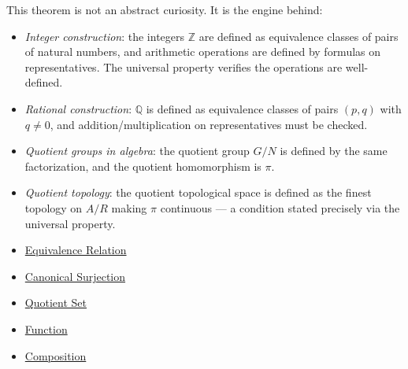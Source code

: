 \begin{remark*}[Exposition]
This theorem is not an abstract curiosity. It is the engine behind:
\begin{itemize}
\item \emph{Integer construction}: the integers $\mathbb{Z}$ are defined as
equivalence classes of pairs of natural numbers, and arithmetic operations
are defined by formulas on representatives. The universal property verifies
the operations are well-defined.
\item \emph{Rational construction}: $\mathbb{Q}$ is defined as equivalence
classes of pairs $(p,q)$ with $q \neq 0$, and addition/multiplication on
representatives must be checked.
\item \emph{Quotient groups in algebra}: the quotient group $G/N$ is defined
by the same factorization, and the quotient homomorphism is $\pi$.
\item \emph{Quotient topology}: the quotient topological space is defined as
the finest topology on $A/R$ making $\pi$ continuous --- a condition stated
precisely via the universal property.
\end{itemize}
\end{remark*}

\begin{dependencies}
\begin{itemize}
  \item \hyperref[def:equivalence-rel]{Equivalence Relation}
  \item \hyperref[def:canonical-surj]{Canonical Surjection}
  \item \hyperref[def:quotient-set]{Quotient Set}
  \item \hyperref[def:function]{Function}
  \item \hyperref[def:composition]{Composition}
\end{itemize}
\end{dependencies}
